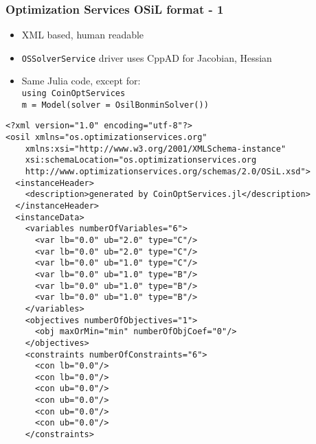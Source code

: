 \documentclass[compressed,dvips,letter]{beamer}
\begin{document}
\begin{frame}[fragile]\frametitle{Optimization Services OSiL format - 1}
\begin{itemize}
\item XML based, human readable
\item \texttt{OSSolverService} driver uses CppAD for Jacobian, Hessian
\item Same Julia code, except for: \\
{\footnotesize
\texttt{using CoinOptServices \\
m = Model(solver = OsilBonminSolver())}}
\end{itemize}
{\fontsize{6pt}{0} \selectfont
\begin{verbatim}
<?xml version="1.0" encoding="utf-8"?>
<osil xmlns="os.optimizationservices.org"
    xmlns:xsi="http://www.w3.org/2001/XMLSchema-instance"
    xsi:schemaLocation="os.optimizationservices.org
    http://www.optimizationservices.org/schemas/2.0/OSiL.xsd">
  <instanceHeader>
    <description>generated by CoinOptServices.jl</description>
  </instanceHeader>
  <instanceData>
    <variables numberOfVariables="6">
      <var lb="0.0" ub="2.0" type="C"/>
      <var lb="0.0" ub="2.0" type="C"/>
      <var lb="0.0" ub="1.0" type="C"/>
      <var lb="0.0" ub="1.0" type="B"/>
      <var lb="0.0" ub="1.0" type="B"/>
      <var lb="0.0" ub="1.0" type="B"/>
    </variables>
    <objectives numberOfObjectives="1">
      <obj maxOrMin="min" numberOfObjCoef="0"/>
    </objectives>
    <constraints numberOfConstraints="6">
      <con lb="0.0"/>
      <con lb="0.0"/>
      <con ub="0.0"/>
      <con ub="0.0"/>
      <con ub="0.0"/>
      <con ub="0.0"/>
    </constraints>
\end{verbatim}
}
\end{frame}
%
%
\end{document}
